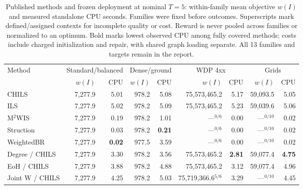 \begin{table}[!t]
\centering
\small
\setlength{\tabcolsep}{3pt}
\caption{Published methods and frozen deployment at nominal $T=5$: within-family mean objective $w(I)$ and measured standalone CPU seconds. Families were fixed before outcomes. Superscripts mark defined/assigned contexts for incomplete quality or cost. Reward is never pooled across families or normalized to an optimum. Bold marks lowest observed CPU among fully covered methods; costs include charged initialization and repair, with shared graph loading separate. All 13 families and targets remain in the report.}
\label{tab:v06-published}
\begin{tabular}{lrrrrrrrr}
\toprule
Method & \multicolumn{2}{c}{Standard/balanced} & \multicolumn{2}{c}{Dense/ground} & \multicolumn{2}{c}{WDP 4xx} & \multicolumn{2}{c}{Grids}\\
 & $w(I)$ & CPU & $w(I)$ & CPU & $w(I)$ & CPU & $w(I)$ & CPU\\
\midrule
CHILS~\cite{grossmann2025chils} & 7,277.9 & 5.01 & 978.2 & 5.08 & 75,573,465.2 & 5.17 & 59,093.5 & 5.05\\
ILS~\cite{grossmann2025chils} & 7,277.9 & 5.02 & 978.2 & 5.09 & 75,573,465.2 & 5.23 & 59,039.6 & 5.06\\
M$^2$WIS~\cite{grossmann2024mmwis} & 7,277.9 & 0.19 & 978.2 & 1.01 & ---$^{0/6}$ & 0.00 & ---$^{0/10}$ & 0.02\\
Struction~\cite{gellner2021struction} & 7,277.9 & 0.03 & 978.2 & \textbf{0.21} & ---$^{0/6}$ & 0.00 & ---$^{0/10}$ & 0.02\\
WeightedBR~\cite{lamm2019weighted} & 7,277.9 & \textbf{0.02} & 977.5 & 3.59 & ---$^{0/6}$ & 0.00 & ---$^{0/10}$ & 0.02\\
Degree / CHILS & 7,277.9 & 3.30 & 978.2 & 3.56 & 75,573,465.2 & \textbf{2.81} & 59,077.4 & \textbf{4.75}\\
EoH / CHILS~\cite{liu2024eoh} & 7,277.9 & 3.88 & 978.2 & 4.88 & 75,573,465.2 & 3.12 & 59,077.4 & 4.96\\
Joint W / CHILS & 7,277.9 & 4.25 & 978.2 & 5.03 & 75,719,366.6$^{5/6}$ & 3.29 & ---$^{0/10}$ & 4.45\\
\bottomrule
\end{tabular}
\end{table}
